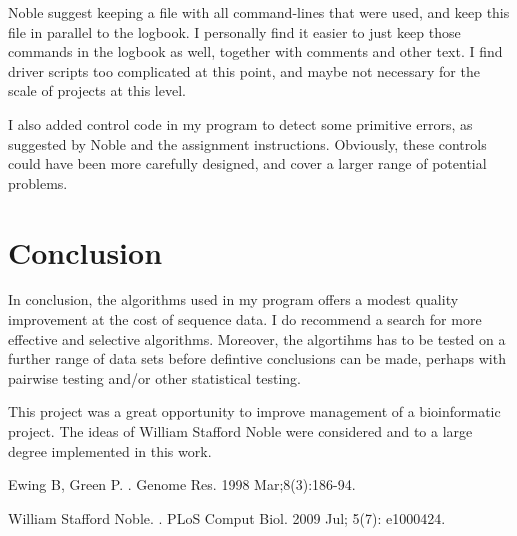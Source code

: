 \documentclass[10pt,letterpaper]{article}
\begin{document}
Noble suggest keeping a file with all command-lines that were used, and keep this file in parallel to the logbook. I personally find it easier to just keep those commands in the logbook as well, together with comments and other text. I find driver scripts too complicated at this point, and maybe not necessary for the scale of projects at this level.

I also added control code in my program to detect some primitive errors, as suggested by Noble and the assignment instructions. Obviously, these controls could have been more carefully designed, and cover a larger range of  potential problems.

\section*{Conclusion}
In conclusion, the algorithms used in my program offers a modest quality improvement at the cost of sequence data. I do recommend a search for more effective and selective algorithms. Moreover, the algortihms has to be tested on a further range of data sets before defintive conclusions can be made, perhaps with pairwise testing and/or other statistical testing.

This project was a great opportunity to improve management of a bioinformatic project. The ideas of William Stafford Noble were considered and to a large degree implemented in this work.



\nolinenumbers

%
%
% 
\begin{thebibliography}{10}
Ewing B, Green P.
.
\newblock Genome Res. 1998 Mar;8(3):186-94.

William Stafford Noble.
.
\newblock PLoS Comput Biol. 2009 Jul; 5(7): e1000424.



\end{thebibliography}
\end{document}
